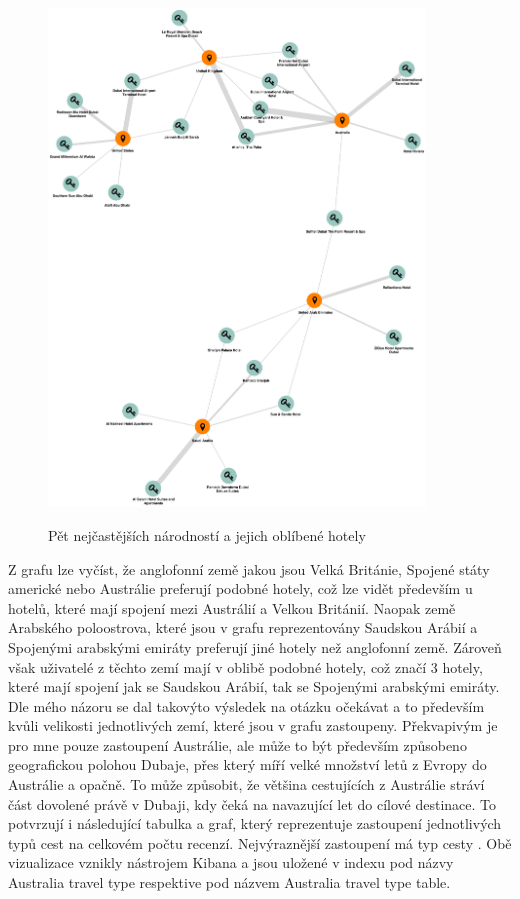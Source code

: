 \documentclass[czech,BP]{thesiskiv}
\begin{document}
\begin{figure} [h]
	\centering
	\includegraphics[width=10cm]{img/5_countries_highest_appearance_graph.eps}
	\label{fig:Top Five}
	\caption{Pět nejčastějších národností a jejich oblíbené hotely}
\end{figure}
Z grafu lze vyčíst, že anglofonní země jakou jsou Velká Británie, Spojené státy americké nebo Austrálie preferují podobné hotely, což lze vidět především u hotelů, které mají spojení mezi Austrálií a Velkou Británií. Naopak země Arabského poloostrova, které jsou v grafu reprezentovány Saudskou Arábií a Spojenými arabskými emiráty preferují jiné hotely než anglofonní země. Zároveň však uživatelé z těchto zemí mají v oblibě podobné hotely, což značí 3 hotely, které mají spojení jak se Saudskou Arábií, tak se Spojenými arabskými emiráty. Dle mého názoru se dal takovýto výsledek na otázku očekávat a to především kvůli velikosti jednotlivých zemí, které jsou v grafu zastoupeny. Překvapivým je pro mne pouze zastoupení Austrálie, ale může to být především způsobeno geografickou polohou Dubaje, přes který míří velké množství letů z Evropy do Austrálie a opačně. To může způsobit, že většina cestujících z Austrálie stráví část dovolené právě v Dubaji, kdy čeká na navazující let do cílové destinace. To potvrzují i následující tabulka a graf, který reprezentuje zastoupení jednotlivých typů cest na celkovém počtu recenzí. Nejvýraznější zastoupení má typ cesty . Obě vizualizace vznikly nástrojem Kibana a jsou uložené v indexu  pod názvy Australia travel type respektive pod názvem Australia travel type table.
\end{document}

